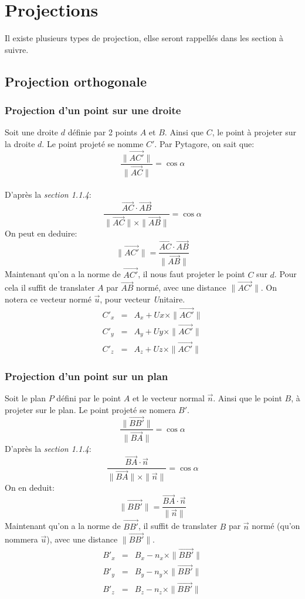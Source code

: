 \documentclass{report}
\begin{document}
\chapter{Projections}
  Il existe plusieurs types de projection, ellse seront rappellés dans les section à suivre.
\section{Projection orthogonale}
\subsection{Projection d'un point sur une droite}
Soit une droite $d$ définie par 2 points $A$ et $B$. Ainsi que $C$, le point à projeter sur la droite $d$. Le point projeté se nomme $C'$.
Par Pytagore, on sait que:
\[ \frac{\|\overrightarrow{AC'}\|}{\|\overrightarrow{AC}\|} = \cos \alpha\]\\
D'après la \emph{section 1.1.4}:
\[\frac{\overrightarrow{AC}\cdot \overrightarrow{AB}}{\|\overrightarrow{AC}\| \times \|\overrightarrow{AB}\|} = \cos \alpha\]
On peut en deduire:
\[ 
\|\overrightarrow{AC'}\| = \frac{\overrightarrow{AC} \cdot \overrightarrow{AB}}{\|\overrightarrow{AB}\|}
\]
Maintenant qu'on a la norme de $\overrightarrow{AC'}$, il nous faut projeter le point $C$ sur $d$. Pour cela il suffit de translater $A$ par $\overrightarrow{AB}$ normé, avec une distance $\|\overrightarrow{AC'}\|$.
On notera ce vecteur normé $\vec{u}$, pour vecteur \emph{U}nitaire.
\[
\begin{array}{rcl}
 C'_x &=&  A_x + Ux \times \|\overrightarrow{AC'}\|\\
 C'_y &=&  A_y + Uy \times \|\overrightarrow{AC'}\|\\
 C'_z &=&  A_z + Uz \times \|\overrightarrow{AC'}\|
\end{array}
\]
\subsection{Projection d'un point sur un plan}
Soit le plan $P$ défini par le point $A$ et le vecteur normal $\vec{n}$. Ainsi que le point $B$, à projeter sur le plan. Le point projeté se nomera $B'$.
\[
\frac{\|\overrightarrow{BB'}\|}{\|\overrightarrow{BA}\|} = \cos \alpha
\]
D'après la \emph{section 1.1.4}:
\[
 \frac{\overrightarrow{BA} \cdot \overrightarrow{n}}{\|\overrightarrow{BA}\| \times \|\overrightarrow{n}\|} = \cos \alpha
\]
On en deduit:
\[
 \|\overrightarrow{BB'}\| = \frac{\overrightarrow{BA} \cdot \overrightarrow{n}}{\|\overrightarrow{n}\|}
\]
Maintenant qu'on a la norme de $\overrightarrow{BB'}$, il suffit de translater $B$ par $\vec{n}$ normé (qu'on nommera $\vec{u}$), avec une distance $\|\overrightarrow{BB'}\|$.
\[
 \begin{array}{rcl}
  B'_x &=& B_x - n_x \times \|\overrightarrow{BB'}\|\\
  B'_y &=& B_y - n_y \times \|\overrightarrow{BB'}\|\\
  B'_z &=& B_z - n_z \times \|\overrightarrow{BB'}\|
 \end{array}
\]
\end{document}
